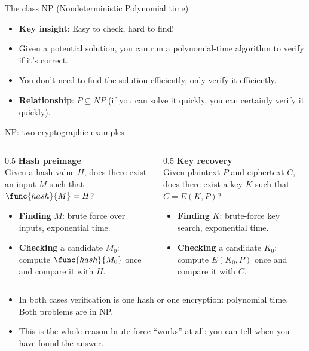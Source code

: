 \ifdefined\PRESENTATION\else\PassOptionsToClass{handout}{beamer}\fi\documentclass[aspectratio=169, lualatex]{beamer}
\begin{document}
\begin{frame}{The class NP (Nondeterministic Polynomial time)}
	\begin{itemize}[<+->]
		\item \textbf{Key insight}: Easy to check, hard to find!
		\item Given a potential solution, you can run a polynomial-time algorithm to verify if it's correct.
		\item You don't need to find the solution efficiently, only verify it efficiently.
		\item \textbf{Relationship}: $P \subseteq NP$ (if you can solve it quickly, you can certainly verify it quickly).
	\end{itemize}
\end{frame}

\begin{frame}{NP: two cryptographic examples}
	\begin{columns}[t]
		\begin{column}{0.5\textwidth}
			\textbf{Hash preimage}\\
			Given a hash value $H$, does there exist an input $M$ such that $\func{hash}{M} = H$?
			\begin{itemize}[<+->]
				\item \textbf{Finding} $M$: brute force over inputs, exponential time.
				\item \textbf{Checking} a candidate $M_0$: compute $\func{hash}{M_0}$ once and compare it with $H$.
			\end{itemize}
		\end{column}
		\begin{column}{0.5\textwidth}
			\textbf{Key recovery}\\
			Given plaintext $P$ and ciphertext $C$, does there exist a key $K$ such that $C = E(K, P)$?
			\begin{itemize}[<+->]
				\item \textbf{Finding} $K$: brute-force key search, exponential time.
				\item \textbf{Checking} a candidate $K_0$: compute $E(K_0, P)$ once and compare it with $C$.
			\end{itemize}
		\end{column}
	\end{columns}
	\vspace{0.4cm}
	\begin{itemize}[<+->]
		\item In both cases verification is one hash or one encryption: polynomial time. Both problems are in NP.
		\item This is the whole reason brute force ``works'' at all: you can tell when you have found the answer.
	\end{itemize}
\end{frame}
\end{document}
